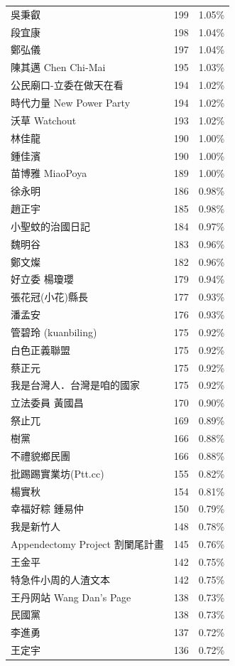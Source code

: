 \documentclass[a4paper, 10pt, conference]{ieeeconf}       %
\begin{document}
\begin{CJK}{UTF8}{bsmi}
\begin{longtable}[c]{@{}lcc@{}}
吳秉叡 & 199 & 1.05\% \\
段宜康 & 198 & 1.04\% \\
鄭弘儀 & 197 & 1.04\% \\
陳其邁 Chen Chi-Mai & 195 & 1.03\% \\
公民廟口-立委在做天在看 & 194 & 1.02\% \\
時代力量 New Power Party & 194 & 1.02\% \\
沃草 Watchout & 193 & 1.02\% \\
林佳龍 & 190 & 1.00\% \\
鍾佳濱 & 190 & 1.00\% \\
苗博雅 MiaoPoya & 189 & 1.00\% \\
徐永明 & 186 & 0.98\% \\
趙正宇 & 185 & 0.98\% \\
小聖蚊的治國日記 & 184 & 0.97\% \\
魏明谷 & 183 & 0.96\% \\
鄭文燦 & 182 & 0.96\% \\
好立委 楊瓊瓔 & 179 & 0.94\% \\
張花冠(小花)縣長 & 177 & 0.93\% \\
潘孟安 & 176 & 0.93\% \\
管碧玲 (kuanbiling) & 175 & 0.92\% \\
白色正義聯盟 & 175 & 0.92\% \\
蔡正元 & 175 & 0.92\% \\
我是台灣人．台灣是咱的國家 & 175 & 0.92\% \\
立法委員 黃國昌 & 170 & 0.90\% \\
祭止兀 & 169 & 0.89\% \\
樹黨 & 166 & 0.88\% \\
不禮貌鄉民團 & 166 & 0.88\% \\
批踢踢實業坊(Ptt.cc) & 155 & 0.82\% \\
楊實秋 & 154 & 0.81\% \\
幸福好粽 鍾易仲 & 150 & 0.79\% \\
我是新竹人 & 148 & 0.78\% \\
Appendectomy Project 割闌尾計畫 & 145 & 0.76\% \\
王金平 & 142 & 0.75\% \\
特急件小周的人渣文本 & 142 & 0.75\% \\
王丹网站 Wang Dan's Page & 138 & 0.73\% \\
民國黨 & 138 & 0.73\% \\
李進勇 & 137 & 0.72\% \\
王定宇 & 136 & 0.72\% \\

\end{longtable}
\end{CJK}
\end{document}
